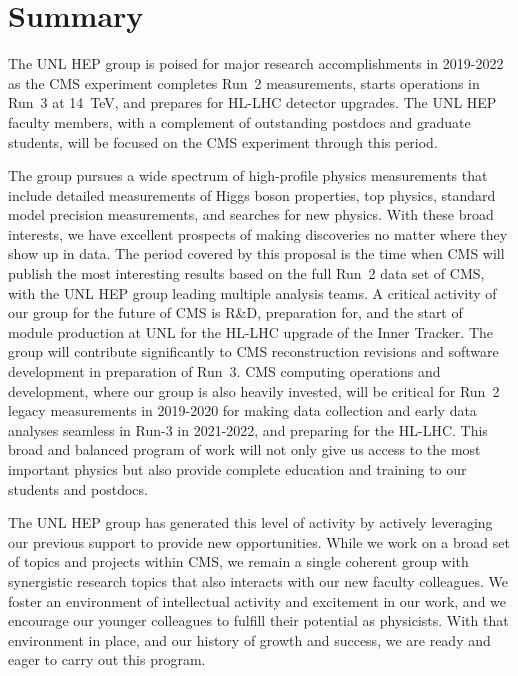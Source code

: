 \section{Summary}

The UNL HEP group is poised for major research accomplishments in 2019-2022 as the CMS experiment completes Run~2 measurements, starts operations in Run~3 at 14~TeV, and prepares for HL-LHC detector upgrades. The UNL HEP faculty members, with a complement of outstanding postdocs and graduate students, will be focused on the CMS experiment through this period.

The group pursues a wide spectrum of high-profile physics measurements that include detailed measurements of Higgs boson properties, top physics, standard model precision measurements, and searches for new physics. With these broad interests, we have excellent prospects of making discoveries no matter where they show up in data. The period covered by this proposal is the time when CMS will publish the most interesting results based on the full Run~2 data set of CMS, with the UNL HEP group leading multiple analysis teams. A critical activity of our group for the future of CMS is R\&D, preparation for, and the start of module production at UNL for the HL-LHC upgrade of the Inner Tracker. The group will contribute significantly to CMS reconstruction revisions and software development in preparation of Run~3. CMS computing operations and development, where our group is also heavily invested, will be critical for Run~2 legacy measurements in 2019-2020 for making data collection and early data analyses seamless in Run-3 in 2021-2022, and preparing for the HL-LHC. This broad and balanced program of work will not only give us access to the most important physics but also provide complete education and training to our students and postdocs.

The UNL HEP group has generated this level of activity by actively leveraging our previous support to provide new opportunities. While we work on a broad set of topics and projects within CMS, we remain a single coherent group with synergistic research topics that also interacts with our new faculty colleagues.  We foster an environment of intellectual activity and excitement in our work, and we encourage our younger colleagues to fulfill their potential as physicists. With that environment in place, and our history of growth and success, we are ready and eager to carry out this program.
